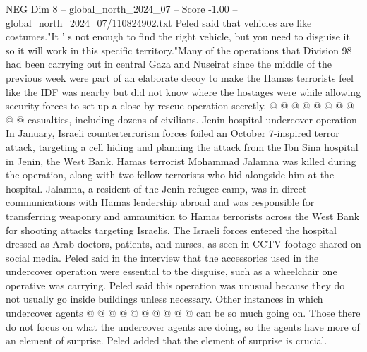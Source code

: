 \begin{textsample}{NEG Dim 8 – global\_north\_2024\_07 – Score -1.00 – global\_north\_2024\_07/110824902.txt}
Peled said that vehicles are like costumes."It ' s not enough to find the right vehicle, but you need to disguise it so it will work in this specific territory."Many of the operations that Division 98 had been carrying out in central Gaza and Nuseirat since the middle of the previous week were part of an elaborate decoy to make the Hamas terrorists feel like the IDF was nearby but did not know where the hostages were while allowing security forces to set up a close-by rescue operation secretly. @ @ @ @ @ @ @ @ @ @ casualties, including dozens of civilians.
Jenin hospital undercover operation In January, Israeli counterterrorism forces foiled an October 7-inspired terror attack, targeting a cell hiding and planning the attack from the Ibn Sina hospital in Jenin, the West Bank.
Hamas terrorist Mohammad Jalamna was killed during the operation, along with two fellow terrorists who hid alongside him at the hospital.
Jalamna, a resident of the Jenin refugee camp, was in direct communications with Hamas leadership abroad and was responsible for transferring weaponry and ammunition to Hamas terrorists across the West Bank for shooting attacks targeting Israelis.
The Israeli forces entered the hospital dressed as Arab doctors, patients, and nurses, as seen in CCTV footage shared on social media.
Peled said in the interview that the accessories used in the undercover operation were essential to the disguise, such as a wheelchair one operative was carrying.
Peled said this operation was unusual because they do not usually go inside buildings unless necessary.
Other instances in which undercover agents @ @ @ @ @ @ @ @ @ @ can be so much going on.
Those there do not focus on what the undercover agents are doing, so the agents have more of an element of surprise.
Peled added that the element of surprise is crucial.

\end{textsample}
